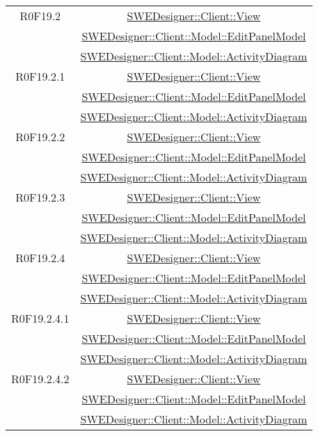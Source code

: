 \documentclass[../SpecificaTecnica.tex]{subfiles}
\begin{document}
\begin{longtable}{|c|c|}
		R0F19.2 & \hyperlink{SWEDesigner::Client::View}{SWEDesigner::Client::View} \\& \hyperlink{SWEDesigner::Client::Model::EditPanelModel}{SWEDesigner::Client::Model::EditPanelModel} \\& \hyperlink{SWEDesigner::Client::Model::ActivityDiagram}{SWEDesigner::Client::Model::ActivityDiagram} \\\hline
		R0F19.2.1 & \hyperlink{SWEDesigner::Client::View}{SWEDesigner::Client::View} \\& \hyperlink{SWEDesigner::Client::Model::EditPanelModel}{SWEDesigner::Client::Model::EditPanelModel} \\& \hyperlink{SWEDesigner::Client::Model::ActivityDiagram}{SWEDesigner::Client::Model::ActivityDiagram} \\\hline
		R0F19.2.2 & \hyperlink{SWEDesigner::Client::View}{SWEDesigner::Client::View} \\& \hyperlink{SWEDesigner::Client::Model::EditPanelModel}{SWEDesigner::Client::Model::EditPanelModel} \\& \hyperlink{SWEDesigner::Client::Model::ActivityDiagram}{SWEDesigner::Client::Model::ActivityDiagram} \\\hline
		R0F19.2.3 & \hyperlink{SWEDesigner::Client::View}{SWEDesigner::Client::View} \\& \hyperlink{SWEDesigner::Client::Model::EditPanelModel}{SWEDesigner::Client::Model::EditPanelModel} \\& \hyperlink{SWEDesigner::Client::Model::ActivityDiagram}{SWEDesigner::Client::Model::ActivityDiagram} \\\hline
		R0F19.2.4 & \hyperlink{SWEDesigner::Client::View}{SWEDesigner::Client::View} \\& \hyperlink{SWEDesigner::Client::Model::EditPanelModel}{SWEDesigner::Client::Model::EditPanelModel} \\& \hyperlink{SWEDesigner::Client::Model::ActivityDiagram}{SWEDesigner::Client::Model::ActivityDiagram} \\\hline
		R0F19.2.4.1 & \hyperlink{SWEDesigner::Client::View}{SWEDesigner::Client::View} \\& \hyperlink{SWEDesigner::Client::Model::EditPanelModel}{SWEDesigner::Client::Model::EditPanelModel} \\& \hyperlink{SWEDesigner::Client::Model::ActivityDiagram}{SWEDesigner::Client::Model::ActivityDiagram} \\\hline
		R0F19.2.4.2 & \hyperlink{SWEDesigner::Client::View}{SWEDesigner::Client::View} \\& \hyperlink{SWEDesigner::Client::Model::EditPanelModel}{SWEDesigner::Client::Model::EditPanelModel} \\& \hyperlink{SWEDesigner::Client::Model::ActivityDiagram}{SWEDesigner::Client::Model::ActivityDiagram} \\\hline

\end{longtable}
\end{document}
